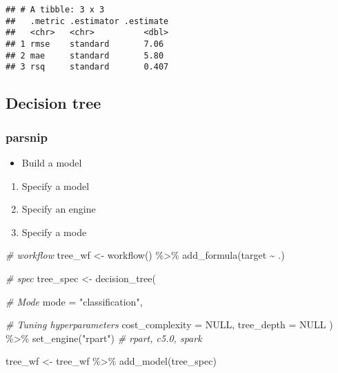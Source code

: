 \documentclass[
]{book}
\newenvironment{Shaded}{\begin{snugshade}}{\end{snugshade}}
\newcommand{\AttributeTok}[1]{\textcolor[rgb]{0.77,0.63,0.00}{#1}}
\newcommand{\CommentTok}[1]{\textcolor[rgb]{0.56,0.35,0.01}{\textit{#1}}}
\newcommand{\ConstantTok}[1]{\textcolor[rgb]{0.00,0.00,0.00}{#1}}
\newcommand{\FunctionTok}[1]{\textcolor[rgb]{0.00,0.00,0.00}{#1}}
\newcommand{\NormalTok}[1]{#1}
\newcommand{\OtherTok}[1]{\textcolor[rgb]{0.56,0.35,0.01}{#1}}
\newcommand{\SpecialCharTok}[1]{\textcolor[rgb]{0.00,0.00,0.00}{#1}}
\newcommand{\StringTok}[1]{\textcolor[rgb]{0.31,0.60,0.02}{#1}}
\providecommand{\tightlist}{%
  \setlength{\itemsep}{0pt}\setlength{\parskip}{0pt}}
\begin{document}
\begin{verbatim}
## # A tibble: 3 x 3
##   .metric .estimator .estimate
##   <chr>   <chr>          <dbl>
## 1 rmse    standard       7.06 
## 2 mae     standard       5.80 
## 3 rsq     standard       0.407
\end{verbatim}

\hypertarget{decision-tree}{%
\subsection{Decision tree}\label{decision-tree}}

\hypertarget{parsnip-1}{%
\subsubsection{parsnip}\label{parsnip-1}}

\begin{itemize}
\tightlist
\item
  Build a model
\end{itemize}

\begin{enumerate}
\def\labelenumi{\arabic{enumi}.}
\tightlist
\item
  Specify a model
\item
  Specify an engine
\item
  Specify a mode
\end{enumerate}

\begin{Shaded}
\begin{Highlighting}[]
\CommentTok{\# workflow}
\NormalTok{tree\_wf }\OtherTok{\textless{}{-}} \FunctionTok{workflow}\NormalTok{() }\SpecialCharTok{\%\textgreater{}\%} \FunctionTok{add\_formula}\NormalTok{(target }\SpecialCharTok{\textasciitilde{}}\NormalTok{ .)}

\CommentTok{\# spec}
\NormalTok{tree\_spec }\OtherTok{\textless{}{-}} \FunctionTok{decision\_tree}\NormalTok{(}

  \CommentTok{\# Mode}
  \AttributeTok{mode =} \StringTok{"classification"}\NormalTok{,}

  \CommentTok{\# Tuning hyperparameters}
  \AttributeTok{cost\_complexity =} \ConstantTok{NULL}\NormalTok{,}
  \AttributeTok{tree\_depth =} \ConstantTok{NULL}
\NormalTok{) }\SpecialCharTok{\%\textgreater{}\%}
  \FunctionTok{set\_engine}\NormalTok{(}\StringTok{"rpart"}\NormalTok{) }\CommentTok{\# rpart, c5.0, spark}

\NormalTok{tree\_wf }\OtherTok{\textless{}{-}}\NormalTok{ tree\_wf }\SpecialCharTok{\%\textgreater{}\%} \FunctionTok{add\_model}\NormalTok{(tree\_spec)}
\end{Highlighting}
\end{Shaded}
\end{document}
